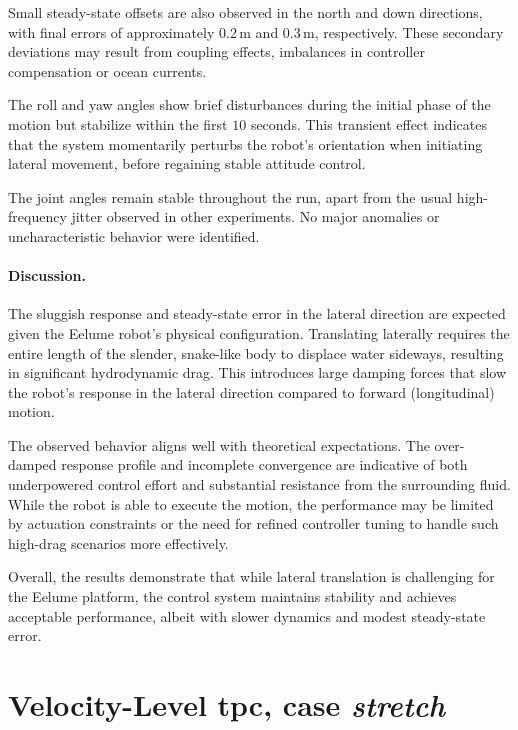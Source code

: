 Small steady-state offsets are also observed in the north and down directions, 
with final errors of approximately \(0.2\,\mathrm{m}\) and \(0.3\,\mathrm{m}\),
respectively. These secondary deviations may result from coupling effects,
imbalances in controller compensation or ocean currents.

The roll and yaw angles show brief disturbances during the initial phase of 
the motion but stabilize within the first \(10\) seconds. This transient 
effect indicates that the system momentarily perturbs the robot’s orientation 
when initiating lateral movement, before regaining stable attitude control.

The joint angles remain stable throughout the run, apart from the usual high-
frequency jitter observed in other experiments. No major anomalies or 
uncharacteristic behavior were identified.

\paragraph{Discussion.}

The sluggish response and steady-state error in the lateral direction are 
expected given the Eelume robot's physical configuration. Translating 
laterally requires the entire length of the slender, snake-like body to 
displace water sideways, resulting in significant hydrodynamic drag. This 
introduces large damping forces that slow the robot's response in the lateral 
direction compared to forward (longitudinal) motion.

The observed behavior aligns well with theoretical expectations. The over-
damped response profile and incomplete convergence are indicative of both 
underpowered control effort and substantial resistance from the surrounding 
fluid. While the robot is able to execute the motion, the performance may be 
limited by actuation constraints or the need for refined controller tuning to 
handle such high-drag scenarios more effectively.

Overall, the results demonstrate that while lateral translation is 
challenging for the Eelume platform, the control system maintains stability 
and achieves acceptable performance, albeit with slower dynamics and modest 
steady-state error.

\FloatBarrier

\newpage
\section{Velocity-Level \gls{tpc}, case \textit{stretch}}
\label{sec:res:stretch}

